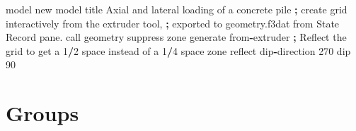 \documentclass[a4paper, nobind]{templates/ociamthesis}
\newenvironment{Shaded}{\begin{snugshade}}{\end{snugshade}}
\newcommand{\DecValTok}[1]{\textcolor[rgb]{0.00,0.00,0.81}{#1}}
\newcommand{\ImportTok}[1]{#1}
\newcommand{\NormalTok}[1]{#1}
\newcommand{\OperatorTok}[1]{\textcolor[rgb]{0.81,0.36,0.00}{\textbf{#1}}}
\newcommand{\StringTok}[1]{\textcolor[rgb]{0.31,0.60,0.02}{#1}}
\renewenvironment{Shaded}
{
  \vspace{10pt}%
  \begin{snugshade}%
}{%
  \end{snugshade}%
  \vspace{8pt}%
}
\begin{document}
\begin{Shaded}
\begin{Highlighting}[]
\NormalTok{model new}
\NormalTok{model title }\StringTok{\textquotesingle{}Axial and lateral loading of a concrete pile\textquotesingle{}}
\OperatorTok{;}\NormalTok{ create grid interactively }\ImportTok{from}\NormalTok{ the extruder tool, }
\OperatorTok{;}\NormalTok{ exported to geometry.f3dat }\ImportTok{from}\NormalTok{ State Record pane.}
\NormalTok{call }\StringTok{\textquotesingle{}geometry\textquotesingle{}}\NormalTok{ suppress}
\NormalTok{zone generate }\ImportTok{from}\OperatorTok{{-}}\NormalTok{extruder}
\OperatorTok{;}\NormalTok{ Reflect the grid to get a }\DecValTok{1}\OperatorTok{/}\DecValTok{2}\NormalTok{ space instead of a }\DecValTok{1}\OperatorTok{/}\DecValTok{4}\NormalTok{ space}
\NormalTok{zone reflect dip}\OperatorTok{{-}}\NormalTok{direction }\DecValTok{270}\NormalTok{ dip }\DecValTok{90}
\end{Highlighting}
\end{Shaded}

\hypertarget{groups-1}{%
\section{Groups}\label{groups-1}}
\end{document}
